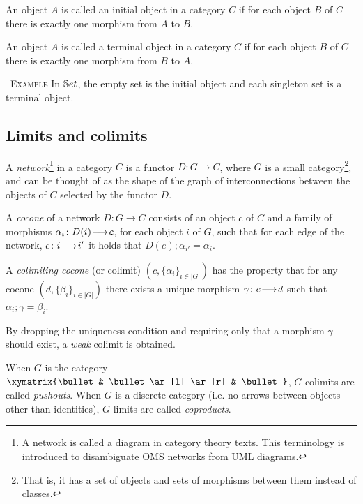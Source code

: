 \documentclass[10pt,fleqn,final]{scrreprt}
\newcommand{\ssclause}[1]{\subsection{#1}}
\newenvironment{example}[0]{\ \newline \textsc{Example}\quad }{}
\begin{document}
\begin{definition}
An object $A$ is called an initial object in a category 
$C$ if for each object $B$ of $C$ there is
exactly one morphism from $A$ to $B$.
\end{definition}

\begin{definition}
An object $A$ is called a terminal object in a category 
$C$ if for each object $B$ of $C$ there is
exactly one morphism from $B$ to $A$.
\end{definition}

\begin{example}
In $\mathbb{S}et$, the empty set is the initial object and each singleton set is a
terminal object.
\end{example}

\ssclause{Limits and colimits}\label{sec:colimits}

\begin{definition}
A \emph{network}\footnote{A network is called a diagram in category theory texts. This terminology is introduced to disambiguate OMS networks
from UML diagrams.} in a category $C$ is 
a functor $D:G\to C$, where $G$ is a small category\footnote{That is, it has a set of objects and sets of morphisms between them
instead of classes.}, and can be thought of as the shape of the graph of
interconnections between the objects of $C$ selected by the functor $D$. 
\end{definition}

\begin{definition}
A \emph{cocone} of
a network $D:G\to C$ consists of an object $c$ of $C$ and a family of
morphisms $\alpha_i\colon D(i)\!\longrightarrow\!c$, for each object $i$ of $G$, such that for
each edge of the network, $e\colon i\!\longrightarrow\!i'$  it holds that 
$D(e);\alpha_{i'} = \alpha_{i}$. 
\end{definition}

\begin{definition}
A \emph{colimiting cocone} (or colimit) $(c, \{\alpha_i\}_{i\in|G|})$ 
has the property that for any 
cocone $(d, \{\beta_i\}_{i\in |G|})$ there exists a unique morphism 
$\gamma\colon c\!\longrightarrow\!d$ such that $\alpha_i;\gamma = \beta_i$.
 \end{definition}
  By dropping the 
uniqueness condition and requiring only that a morphism $\gamma$ should exist,
 a \emph{weak} colimit is obtained. 

When $G$ is the category $\xymatrix{\bullet & \bullet \ar[l] \ar[r]
& \bullet }$, $G$-colimits are
called  \emph{pushouts}. 
When $G$ is a discrete category (i.e. no arrows between objects other than identities),
 $G$-limits are called \emph{coproducts}.
\end{document}
